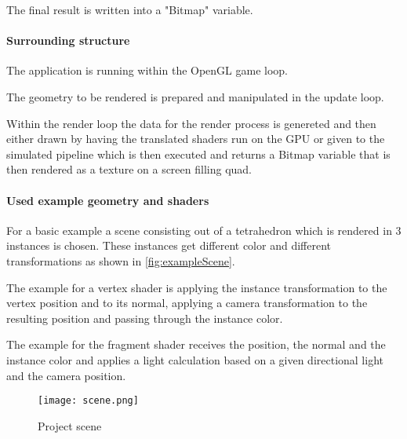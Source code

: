 The final result is written into a "Bitmap" variable.

\paragraph{Surrounding structure}

The application is running within the OpenGL game loop.

The geometry to be rendered is prepared and manipulated in the update loop.

Within the render loop the data for the render process is genereted and then either drawn by having the translated shaders run on the GPU or given to the simulated pipeline which is then executed and returns a Bitmap variable that is then rendered as a texture on a screen filling quad.

\paragraph{Used example geometry and shaders}

For a basic example a scene consisting out of a tetrahedron which is rendered in 3 instances is chosen. These instances get different color and different transformations as shown in  \autoref{fig:exampleScene}.

The example for a vertex shader is applying the instance transformation to the vertex position and to its normal, applying a camera transformation to the resulting position and passing through the instance color.

The example for the fragment shader receives the position, the normal and the instance color and applies a light calculation based on a given directional light and the camera position.

\begin{figure}[h!]
  \centering 
  \texttt{[image: scene.png]}
  \caption[Screenshot of example scene of the project]{Project scene}
  \label{fig:exampleScene}
\end{figure}